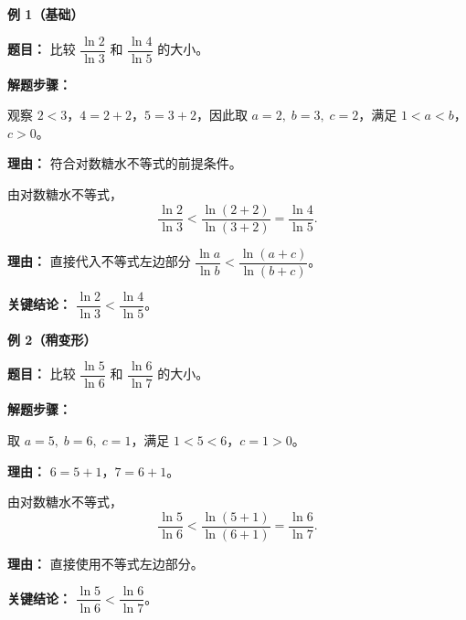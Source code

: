 \begin{examplebox}
	\textbf{\textcolor{CExample}{例 1（基础）}}

	\textbf{\textcolor{CExample}{题目：}}
	比较 $\dfrac{\ln 2}{\ln 3}$ 和 $\dfrac{\ln 4}{\ln 5}$ 的大小。

	\textbf{\textcolor{CExample}{解题步骤：}}
	\begin{description}[style=nextline, leftmargin=2.8em, labelsep=0.5em, itemsep=0.45em]
		\item[\textbf{第一步（识别条件）：}] 观察 $2<3$，$4=2+2$，$5=3+2$，因此取 $a=2,\;b=3,\;c=2$，满足 $1<a<b$，$c>0$。
			\par\textbf{理由：} 符合对数糖水不等式的前提条件。

		\item[\textbf{第二步（套用结论）：}] 由对数糖水不等式，
			\[
				\frac{\ln 2}{\ln 3} < \frac{\ln(2+2)}{\ln(3+2)} = \frac{\ln 4}{\ln 5}.
			\]
			\par\textbf{理由：} 直接代入不等式左边部分 $\dfrac{\ln a}{\ln b}<\dfrac{\ln(a+c)}{\ln(b+c)}$。
	\end{description}

	\textbf{\textcolor{CExample}{关键结论：}}
	$\boxed{\dfrac{\ln 2}{\ln 3}<\dfrac{\ln 4}{\ln 5}}$。
\end{examplebox}
\begin{examplebox}
	\textbf{\textcolor{CExample}{例 2（稍变形）}}

	\textbf{\textcolor{CExample}{题目：}}
	比较 $\dfrac{\ln 5}{\ln 6}$ 和 $\dfrac{\ln 6}{\ln 7}$ 的大小。

	\textbf{\textcolor{CExample}{解题步骤：}}
	\begin{description}[style=nextline, leftmargin=2.8em, labelsep=0.5em, itemsep=0.45em]
		\item[\textbf{第一步（构造增量）：}] 取 $a=5,\;b=6,\;c=1$，满足 $1<5<6$，$c=1>0$。
			\par\textbf{理由：} $6=5+1$，$7=6+1$。

		\item[\textbf{第二步（应用结论）：}] 由对数糖水不等式，
			\[
				\frac{\ln 5}{\ln 6} < \frac{\ln(5+1)}{\ln(6+1)} = \frac{\ln 6}{\ln 7}.
			\]
			\par\textbf{理由：} 直接使用不等式左边部分。
	\end{description}

	\textbf{\textcolor{CExample}{关键结论：}}
	$\boxed{\dfrac{\ln 5}{\ln 6}<\dfrac{\ln 6}{\ln 7}}$。
\end{examplebox}
